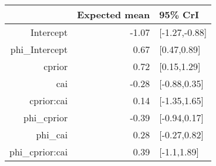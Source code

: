 \begin{tabular}{rrl}
  \hline
 & Expected mean & 95\% CrI \\ 
  \hline
Intercept & -1.07 & [-1.27,-0.88] \\ 
  phi\_Intercept & 0.67 & [0.47,0.89] \\ 
  cprior & 0.72 & [0.15,1.29] \\ 
  cai & -0.28 & [-0.88,0.35] \\ 
  cprior:cai & 0.14 & [-1.35,1.65] \\ 
  phi\_cprior & -0.39 & [-0.94,0.17] \\ 
  phi\_cai & 0.28 & [-0.27,0.82] \\ 
  phi\_cprior:cai & 0.39 & [-1.1,1.89] \\ 
   \hline
\end{tabular}

